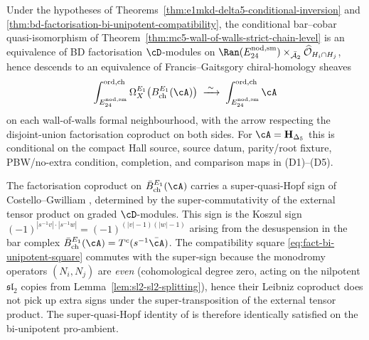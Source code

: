 \begin{corollary}
\label{cor:bd-factorisation-bar-cobar-preservation}
%
Under the hypotheses of
Theorems~\textup{\ref{thm:e1mkd-delta5-conditional-inversion}} and
\textup{\ref{thm:bd-factorisation-bi-unipotent-compatibility}}, the
conditional bar--cobar quasi-isomorphism of
Theorem~\textup{\ref{thm:mc5-wall-of-walls-strict-chain-level}} is an
equivalence of BD factorisation $\cD$-modules on
$\Ran(E^{\mathrm{nod,sm}}_{24})\times_{\bar{\mathcal A}_2}
\widehat{\mathcal O}_{H_i\cap H_j}$, hence descends to an equivalence of
Francis--Gaitsgory chiral-homology sheaves
\[
\int^{\mathrm{ord},\mathrm{ch}}_{E^{\mathrm{nod,sm}}_{24}}
\Omega^{E_1}_X\bigl(B^{E_1}_{\mathrm{ch}}(\cA)\bigr)
\;\xrightarrow{\;\sim\;}\;
\int^{\mathrm{ord},\mathrm{ch}}_{E^{\mathrm{nod,sm}}_{24}}\cA
\]
on each wall-of-walls formal neighbourhood, with the arrow respecting
the disjoint-union factorisation coproduct on both sides. For
$\cA=\mathbf H_{\Delta_5}$ this is conditional on the compact Hall
source, source datum, parity/root fixture, PBW/no-extra condition,
completion, and comparison maps in \textup{(D1)--(D5)}.
\end{corollary}

\begin{remark}
\label{rem:super-quasi-hopf-koszul-sign}
%
The factorisation coproduct on $\bar B^{E_1}_{\mathrm{ch}}(\cA)$ carries
a super-quasi-Hopf sign of Costello--Gwilliam
\cite[\S\S 6.3, 7.2]{CG17}, determined by the super-commutativity of the
external tensor product on graded $\cD$-modules. This sign is the
Koszul sign $(-1)^{|s^{-1}v|\cdot|s^{-1}w|}=(-1)^{(|v|-1)(|w|-1)}$
arising from the desuspension in the bar complex
$\bar B^{E_1}_{\mathrm{ch}}(\cA)=T^c(s^{-1}\bar\cA)$. The compatibility
square \eqref{eq:fact-bi-unipotent-square} commutes with the super-sign
because the monodromy operators $(N_i,N_j)$ are \emph{even}
(cohomological degree zero, acting on the nilpotent $\mathfrak{sl}_2$
copies from Lemma~\textup{\ref{lem:sl2-sl2-splitting}}), hence their
Leibniz coproduct does not pick up extra signs under the
super-transposition of the external tensor product. The super-quasi-Hopf
identity of \cite[\S 7.2]{CG17} is therefore identically satisfied on
the bi-unipotent pro-ambient.
\end{remark}

